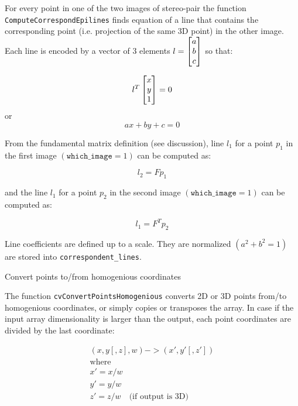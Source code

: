 For every point in one of the two images of stereo-pair the function
\texttt{ComputeCorrespondEpilines} finds equation of a line that
contains the corresponding point (i.e. projection of the same 3D
point) in the other image. Each line is encoded by a vector of 3
elements $l = \begin{bmatrix} a\\ b\\ c \end{bmatrix}$ so that:

\[ l^T \begin{bmatrix} x\\ y\\ 1 \end{bmatrix} = 0 \]
or
\[ a x + b y + c = 0 \]

From the fundamental matrix definition (see 
discussion), line $l_1$ for a point $p_1$ in the first image
$(\texttt{which\_image} =1)$ can be computed as:

\[ l_2 = F p_1 \]

and the line $l_1$ for a point $p_2$ in the second image $(\texttt{which\_image} =1)$ can be computed as:

\[ l_1 = F^T p_2 \]

Line coefficients are defined up to a scale. They are normalized $(a^2+b^2=1)$ are stored into \texttt{correspondent\_lines}.

\label{ConvertPointsHomogenious}

Convert points to/from homogenious coordinates


\begin{description}
\end{description}

The function \texttt{cvConvertPointsHomogenious} converts 2D or 3D points from/to homogenious coordinates, or simply copies or transposes the array. In case if the input array dimensionality is larger than the output, each point coordinates are divided by the last coordinate:

\[
\begin{array}{l}
(x,y[,z],w) -> (x',y'[,z'])\\
\text{where} \\
x' = x/w \\
y' = y/w \\
z' = z/w \quad \text{(if output is 3D)}
\end{array}
\]


